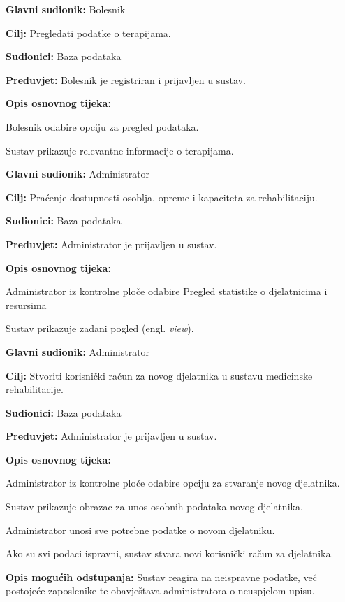 \documentclass[12pt]{report}
\newenvironment{packed_enum}{
	\begin{enumerate}
		\setlength{\itemsep}{0pt}
		\setlength{\parskip}{0pt}
		\setlength{\parsep}{0pt}
	}{\end{enumerate}}
\begin{document}
	\item \textbf{Glavni sudionik:} Bolesnik
	\item \textbf{Cilj:} Pregledati podatke o terapijama.
	\item \textbf{Sudionici:} Baza podataka
	\item \textbf{Preduvjet:} Bolesnik je registriran i prijavljen u sustav.
	\item \textbf{Opis osnovnog tijeka:}
	\begin{packed_enum}
		\item Bolesnik odabire opciju za pregled podataka.
		\item Sustav prikazuje relevantne informacije o terapijama.
	\end{packed_enum}
\closeusecase


	\item \textbf{Glavni sudionik:} Administrator 
	\item \textbf{Cilj:} Praćenje dostupnosti osoblja, opreme i kapaciteta za rehabilitaciju.
	\item \textbf{Sudionici:} Baza podataka
	\item \textbf{Preduvjet:} Administrator je prijavljen u sustav.
	\item \textbf{Opis osnovnog tijeka:}
	\begin{packed_enum}
		\item Administrator iz kontrolne ploče odabire Pregled statistike o djelatnicima i resursima
		\item Sustav prikazuje zadani pogled (engl. \textit{view}). 
	\end{packed_enum}
\closeusecase


	\item \textbf{Glavni sudionik:} Administrator
	\item \textbf{Cilj:} Stvoriti korisnički račun za novog djelatnika u sustavu medicinske rehabilitacije.
	\item \textbf{Sudionici:} Baza podataka
	\item \textbf{Preduvjet:} Administrator je prijavljen u sustav.
	\item \textbf{Opis osnovnog tijeka:}
	\begin{packed_enum}
		\item Administrator iz kontrolne ploče odabire opciju za stvaranje novog djelatnika.
		\item Sustav prikazuje obrazac za unos osobnih podataka novog djelatnika.
		\item Administrator unosi sve potrebne podatke o novom djelatniku.
		\item Ako su svi podaci ispravni, sustav stvara novi korisnički račun za djelatnika.
	\end{packed_enum}
	\item \textbf{Opis mogućih odstupanja:}
	Sustav reagira na neispravne podatke, već postojeće zaposlenike te obavještava administratora o neuspjelom upisu.
\closeusecase
\end{document}
